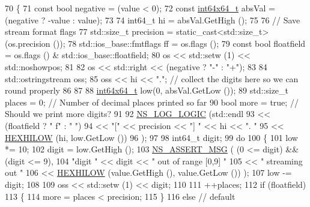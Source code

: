 \begin{DoxyCode}
70 \{
71   \textcolor{keyword}{const} \textcolor{keywordtype}{bool} negative = (value < 0);
72   \textcolor{keyword}{const} \hyperlink{classint64x64__t}{int64x64\_t} absVal = (negative ? -value : value);
73 
74   int64\_t hi = absVal.GetHigh ();
75 
76   \textcolor{comment}{// Save stream format flags}
77   std::size\_t precision = \textcolor{keyword}{static\_cast<}std::size\_t\textcolor{keyword}{>} (os.precision ());
78   std::ios\_base::fmtflags ff = os.flags ();
79   \textcolor{keyword}{const} \textcolor{keywordtype}{bool} floatfield = os.flags () & std::ios\_base::floatfield;
80   os << std::setw (1) << std::noshowpos;
81 
82   os << std::right << (negative ? \textcolor{stringliteral}{"-"} : \textcolor{stringliteral}{"+"});
83 
84   std::ostringstream oss;
85   oss << hi << \textcolor{stringliteral}{"."};  \textcolor{comment}{// collect the digits here so we can round properly}
86 
87 
88   \hyperlink{classint64x64__t}{int64x64\_t} low(0, absVal.GetLow ());
89   std::size\_t places = 0;    \textcolor{comment}{// Number of decimal places printed so far}
90   \textcolor{keywordtype}{bool} more = \textcolor{keyword}{true};  \textcolor{comment}{// Should we print more digits?}
91 
92   \hyperlink{group__logging_ga88acd260151caf2db9c0fc84997f45ce}{NS\_LOG\_LOGIC} (std::endl
93                 << (floatfield ? \textcolor{stringliteral}{" f"} : \textcolor{stringliteral}{"  "})
94                 << \textcolor{stringliteral}{"["} << precision << \textcolor{stringliteral}{"] "} << hi << \textcolor{stringliteral}{". "}
95                 << \hyperlink{group__highprec_gab4ef18031edb07b2d7cb6197583f3c51}{HEXHILOW} (hi, low.GetLow ())
96                 );
97 
98   int64\_t digit;
99   \textcolor{keywordflow}{do}
100     \{
101       low *= 10;
102       digit = low.GetHigh ();
103       \hyperlink{assert_8h_aff5ece9066c74e681e74999856f08539}{NS\_ASSERT\_MSG} ( (0 <= digit) && (digit <= 9),
104                       \textcolor{stringliteral}{"digit "} << digit << \textcolor{stringliteral}{" out of range [0,9] "}
105                       << \textcolor{stringliteral}{" streaming out "}
106                       << \hyperlink{group__highprec_gab4ef18031edb07b2d7cb6197583f3c51}{HEXHILOW} (value.GetHigh (), value.GetLow ()) );
107       low -= digit;
108 
109       oss << std::setw (1) << digit;
110 
111       ++places;
112       \textcolor{keywordflow}{if} (floatfield)
113         \{
114           more = places < precision;
115         \}
116       \textcolor{keywordflow}{else}  \textcolor{comment}{// default}

\end{DoxyCode}
